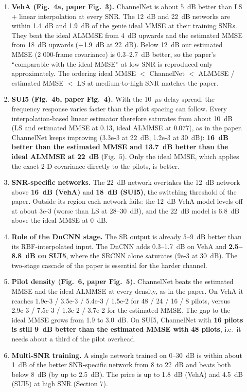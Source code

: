\documentclass[10pt,a4paper]{article}
\begin{document}
\begin{enumerate}
  \item \textbf{VehA (Fig.~4a, paper Fig.~3).} ChannelNet is about 5~dB better than LS + linear interpolation at every SNR. The 12~dB and 22~dB networks are within 1.4~dB and 1.9~dB of the genie ideal MMSE at their training SNRs. They beat the ideal ALMMSE from 4~dB upwards and the estimated MMSE from 18~dB upwards (+1.9~dB at 22~dB). Below 12~dB our estimated MMSE (2 000-frame covariance) is 0.3--2.7~dB better, so the paper's ``comparable with the ideal MMSE'' at low SNR is reproduced only approximately. The ordering ideal MMSE $<$ ChannelNet $<$ ALMMSE / estimated MMSE $<$ LS at medium-to-high SNR matches the paper.
  \item \textbf{SUI5 (Fig.~4b, paper Fig.~4).} With the 10~$\mu$s delay spread, the frequency response varies faster than the pilot spacing can follow. Every interpolation-based linear estimator therefore saturates from about 10~dB (LS and estimated MMSE at 0.13, ideal ALMMSE at 0.077), as in the paper. ChannelNet keeps improving (3.3e-3 at 22~dB, 1.2e-3 at 30~dB): \textbf{16~dB better than the estimated MMSE and 13.7~dB better than the ideal ALMMSE at 22~dB} (Fig.~5). Only the ideal MMSE, which applies the exact 2-D covariance directly to the pilots, is better.
  \item \textbf{SNR-specific networks.} The 22~dB network overtakes the 12~dB network above \textbf{16~dB (VehA)} and \textbf{18~dB (SUI5)}, the switching threshold of the paper. Outside its region each network fails: the 12~dB VehA model levels off at about 3e-3 (worse than LS at 28--30~dB), and the 22~dB model is 6.8~dB above the ideal MMSE at 0~dB.
  \item \textbf{Role of the DnCNN stage.} The SR output is already 5--9~dB better than its RBF-interpolated input. The DnCNN adds 0.3--1.7~dB on VehA and \textbf{2.5--8.8~dB on SUI5}, where the SRCNN alone saturates (9e-3 at 30~dB). The two-stage cascade of the paper is essential for the harder channel.
  \item \textbf{Pilot density (Fig.~6, paper Fig.~5).} ChannelNet beats the estimated MMSE and the ideal ALMMSE at every density, as in the paper. On VehA it reaches 1.9e-3 / 3.5e-3 / 5.4e-3 / 1.5e-2 for 48 / 24 / 16 / 8 pilots, versus 2.9e-3 / 7.5e-3 / 1.3e-2 / 3.7e-2 for the estimated MMSE. The gap to the ideal MMSE grows from 1.9 to 3.0~dB. On SUI5, ChannelNet with \textbf{16 pilots is still 9~dB better than the estimated MMSE with 48 pilots}, i.e.\ it needs about a third of the pilot overhead.
  \item \textbf{Multi-SNR training.} A single network trained on 0--30~dB is within about 1~dB of the better SNR-specific network from 8 to 22~dB and beats both below 8~dB (by up to 2.5~dB). The price is up to 1.8~dB (VehA) and 4.5~dB (SUI5) at high SNR (Section 7).
\end{enumerate}
\end{document}
